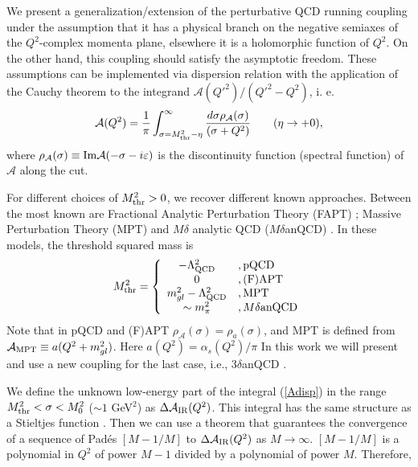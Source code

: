 \documentclass[3p,times,twocolumn]{elsarticle}
\def\be{\begin{equation}}
\def\ee{\end{equation}}
\newcommand{\A}{{\mathcal{A}}}
\begin{document}
We present a generalization/extension of the perturbative QCD running coupling 
under the assumption that it has a physical branch on the negative semiaxes of the 
$Q^2$-complex momenta plane, elsewhere it is a holomorphic function of $Q^2$. 
On the other hand, this coupling should satisfy the asymptotic freedom. These assumptions can be implemented via dispersion relation with the application of the Cauchy theorem to the integrand  $\A(Q'^2)/(Q'^2 - Q^2)$, i. e. 
\be
\A(Q^2) = \frac{1}{\pi} \int_{\sigma=M^2_{\rm thr}-\eta}^{\infty} \frac{d \sigma \rho_{\A}(\sigma)}{(\sigma + Q^2)} 
\qquad (\eta \to +0),
\label{Adisp}
\ee
where $\rho_{\A}(\sigma) \equiv {\rm Im} \mathcal{A}(-\sigma - i \varepsilon)$ is the discontinuity function (spectral function) of $\A$ along the cut. 

For different choices of $M_{\rm thr}^2>0$, we recover different known approaches. Between the most known are Fractional Analytic Perturbation Theory (FAPT) \cite{APT,BMS}; Massive Perturbation Theory (MPT) \cite{ShMPT} and $M\delta$ analytic QCD ($M\delta$anQCD) \cite{2danQCD,3danQCD1,3danQCD2}. In these  models, the threshold squared mass is 
\begin{equation}
M_{\rm thr}^2 = \left\{ \begin{array}{cl} 
-\Lambda_{\rm QCD}^2& ,{\rm pQCD}\\ 0& ,{\rm (F)APT}\\ 
m_{gl}^2-\Lambda_{\rm QCD}^2&, {\rm MPT} \\ \sim m_\pi^2&, M\delta {\rm anQCD}  \end{array}\right.
\end{equation}
Note that in pQCD and (F)APT $\rho_{\A}(\sigma) = \rho_{a}(\sigma)$, and MPT is defined from $\A_{\rm MPT}\equiv a(Q^2+m_{gl}^2)$. Here $a(Q^2)=\alpha_s(Q^2)/\pi$
In this work we will present and use a new coupling for the last case, i.e., 3$\delta$anQCD \cite{3danQCD1,3danQCD2}.

We define the unknown low-energy part of the integral (\ref{Adisp}) in the range $M_{\rm thr}^2<\sigma<M_0^2$ ($\sim1$ GeV$^2$) as $\Delta \A_{\rm IR}(Q^2)$. This integral has the same structure as a Stieltjes function \cite{Baker}. Then we can use a theorem that guarantees the convergence of a sequence of Pad\'es $[M-1/M]$ to $\Delta \A_{\rm IR}(Q^2)$ as $M\to\infty$. $[M-1/M]$ is a polynomial in $Q^2$ of power $M-1$ divided by a polynomial of power $M$. Therefore,
\end{document}
